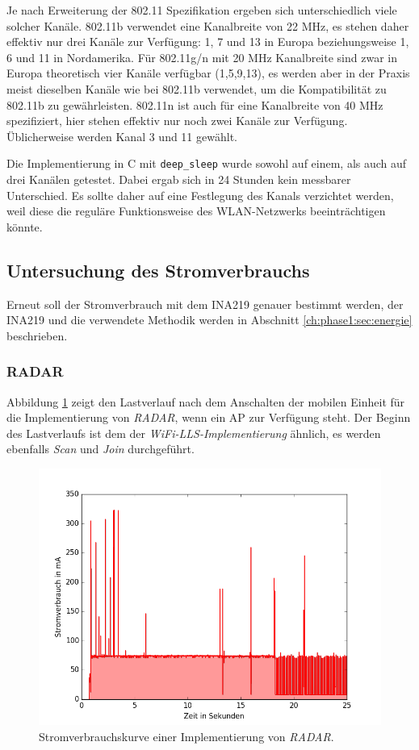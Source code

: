 Je nach Erweiterung der 802.11 Spezifikation ergeben sich unterschiedlich viele solcher Kanäle.
802.11b verwendet eine Kanalbreite von 22 MHz, es stehen daher effektiv nur drei Kanäle zur Verfügung: 1, 7 und 13 in Europa beziehungsweise 1, 6 und 11 in Nordamerika.
Für 802.11g/n mit 20 MHz Kanalbreite sind zwar in Europa theoretisch vier Kanäle verfügbar (1,5,9,13), es werden aber in der Praxis meist dieselben Kanäle wie bei 802.11b verwendet, um die Kompatibilität zu 802.11b zu gewährleisten.
802.11n ist auch für eine Kanalbreite von 40 MHz spezifiziert, hier stehen effektiv nur noch zwei Kanäle zur Verfügung. 
Üblicherweise werden Kanal 3 und 11 gewählt.

Die Implementierung in C mit \texttt{deep\_sleep} wurde sowohl auf einem, als auch auf drei Kanälen getestet.
Dabei ergab sich in 24 Stunden kein messbarer Unterschied.
Es sollte daher auf eine Festlegung des Kanals verzichtet werden, weil diese die reguläre Funktionsweise des WLAN-Netzwerks beeinträchtigen könnte.


\subsection{Untersuchung des Stromverbrauchs}
Erneut soll der Stromverbrauch mit dem INA219 genauer bestimmt werden, der INA219 und die verwendete Methodik werden in Abschnitt \ref{ch:phase1:sec:energie} beschrieben.


\subsubsection{RADAR}
\label{ch:phase2:sec:powerradar}
Abbildung \ref{fig:radar5s} zeigt den Lastverlauf nach dem Anschalten der mobilen Einheit für die Implementierung von \emph{RADAR}, wenn ein AP zur Verfügung steht. 
Der Beginn des Lastverlaufs ist dem der \emph{WiFi-LLS-Implementierung} ähnlich, es werden ebenfalls \emph{Scan} und \emph{Join} durchgeführt.

\begin{figure}[h!]
  \centering
	\includegraphics[width=\textwidth]{plots/radar5s.png}
  \caption{Stromverbrauchskurve einer Implementierung von \emph{RADAR}.}
  \label{fig:radar5s}
\end{figure}

